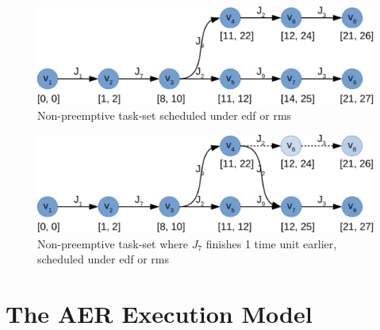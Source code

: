 \documentclass{kththesis}
\begin{document}
\begin{figure}

    \centering

    \includegraphics[width=0.8\linewidth]{images/scheduling_graph.pdf}

    \caption{Non-preemptive task-set scheduled under \acrshort{edf} or \acrshort{rms}}

    \label{fig:scheduling_graph}

\end{figure}


\begin{figure}

    \centering

    \includegraphics[width=0.8\linewidth]{images/scheduling_graph_merge.pdf}

    \caption{Non-preemptive task-set where $J_7$ finishes 1 time unit earlier, scheduled under
    \acrshort{edf} or \acrshort{rms}}

    \label{fig:scheduling_graph_merge}

\end{figure}

\section{The AER Execution Model} \label{sec:aer_execution_model}
\end{document}
